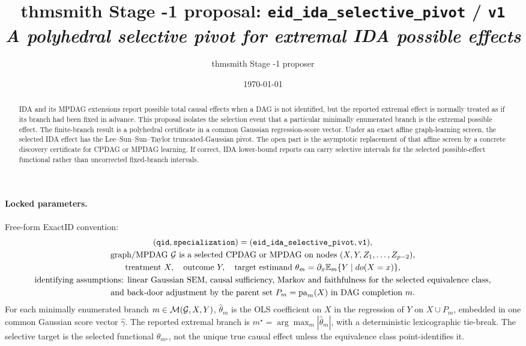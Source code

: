 \documentclass[11pt]{article}
\title{thmsmith Stage -1 proposal: \texttt{eid\_ida\_selective\_pivot} / \texttt{v1}%
  \\ \large\textit{A polyhedral selective pivot for extremal IDA possible effects}}
\author{thmsmith Stage -1 proposer}
\date{\today}
\newcommand{\E}{\mathbb{E}}
\theoremstyle{definition}
\theoremstyle{plain}
\theoremstyle{remark}
\begin{document}
\maketitle


\paragraph{Locked parameters.}
Free-form ExactID convention:
\[
\begin{gathered}
(\texttt{qid},\texttt{specialization})=(\texttt{eid\_ida\_selective\_pivot},\texttt{v1}),\\
\text{graph/MPDAG }{\cal G}\text{ is a selected CPDAG or MPDAG on nodes }(X,Y,Z_1,\ldots,Z_{p-2}),\\
\text{treatment }X,\quad \text{outcome }Y,\quad
\text{target estimand }\theta_m=\partial_x \E_m\{Y\mid do(X=x)\},\\
\text{identifying assumptions: linear Gaussian SEM, causal sufficiency, Markov and faithfulness for the selected equivalence class,}\\
\text{and back-door adjustment by the parent set }P_m=\operatorname{pa}_m(X)\text{ in DAG completion }m.
\end{gathered}
\]
For each minimally enumerated branch \(m\in{\cal M}({\cal G},X,Y)\), \(\hat\theta_m\) is the OLS coefficient on \(X\) in the regression of \(Y\) on \(X\cup P_m\), embedded in one common Gaussian score vector \(\hat\gamma\). The reported extremal branch is \(m^\star=\arg\max_m |\hat\theta_m|\), with a deterministic lexicographic tie-break. The selective target is the selected functional \(\theta_{m^\star}\), not the unique true causal effect unless the equivalence class point-identifies it.

\begin{abstract}
IDA and its MPDAG extensions report possible total causal effects when a DAG is not identified, but the reported extremal effect is normally treated as if its branch had been fixed in advance. This proposal isolates the selection event that a particular minimally enumerated branch is the extremal possible effect. The finite-branch result is a polyhedral certificate in a common Gaussian regression-score vector. Under an exact affine graph-learning screen, the selected IDA effect has the Lee--Sun--Sun--Taylor truncated-Gaussian pivot. The open part is the asymptotic replacement of that affine screen by a concrete discovery certificate for CPDAG or MPDAG learning. If correct, IDA lower-bound reports can carry selective intervals for the selected possible-effect functional rather than uncorrected fixed-branch intervals.
\end{abstract}
\end{document}
